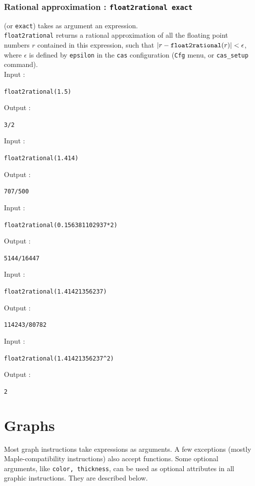 \documentclass[a4paper,11pt]{book}
\begin{document}
\subsection{Rational approximation : {\tt float2rational exact}}
 (or {\tt exact}) 
takes as argument an expression.\\
{\tt float2rational} returns a rational approximation of 
all the floating point numbers $r$ contained in this expression, such
that $|r-\mbox{\tt float2rational}(r)|<\epsilon$, where
$\epsilon$  is defined by {\tt epsilon} in the {\tt cas} configuration 
({\tt Cfg} menu, or {\tt cas\_setup} command).\\
Input :
\begin{center}{\tt float2rational(1.5)}\end{center}
Output :
\begin{center}{\tt 3/2}\end{center}
Input :
\begin{center}{\tt float2rational(1.414)}\end{center}
Output :
\begin{center}{\tt 707/500}\end{center}
Input :
\begin{center}{\tt float2rational(0.156381102937*2)}\end{center}
Output :
\begin{center}{\tt 5144/16447}\end{center}
Input :
\begin{center}{\tt float2rational(1.41421356237)}\end{center}
Output :
\begin{center}{\tt 114243/80782}\end{center}
Input :
\begin{center}{\tt float2rational(1.41421356237\verb|^|2)}\end{center}
Output :
\begin{center}{\tt 2}\end{center}

\chapter{Graphs}\label{sec:plot}
Most graph instructions take expressions as arguments. A few
exceptions (mostly Maple-compatibility instructions) also accept
functions. 
Some optional arguments, like {\tt color, thickness}, can  be used as optional
attributes in all graphic instructions. They are described below.
\end{document}

